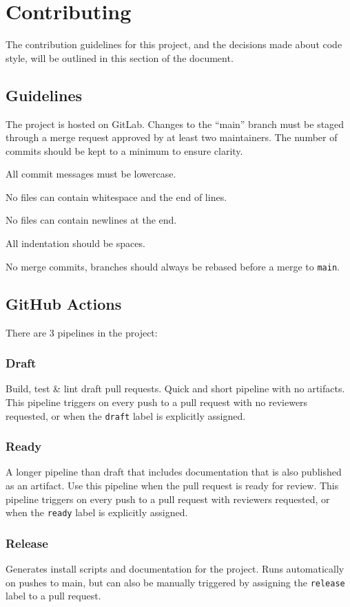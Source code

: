 \pagebreak


\section{Contributing}

The contribution guidelines for this project, and the decisions made about code style,
will be outlined in this section of the document.

\subsection{Guidelines}

The project is hosted on GitLab.
Changes to the ``main'' branch must be staged through a merge request approved by at least two maintainers.
The number of commits should be kept to a minimum to ensure clarity.

All commit messages must be lowercase.

No files can contain whitespace and the end of lines.

No files can contain newlines at the end.

All indentation should be spaces.

No merge commits, branches should always be rebased before a merge to \texttt{main}.

\subsection{GitHub Actions}

There are 3 pipelines in the project:
\subsubsection{Draft}
Build, test \& lint draft pull requests.
Quick and short pipeline with no artifacts.
This pipeline triggers on every push to a pull request with no reviewers requested, or when the \texttt{draft} label is explicitly assigned.
\subsubsection{Ready}
A longer pipeline than draft that includes documentation that is also published as an artifact.
Use this pipeline when the pull request is ready for review.
This pipeline triggers on every push to a pull request with reviewers requested, or when the \texttt{ready} label is explicitly assigned.
\subsubsection{Release}
Generates install scripts and documentation for the project.
Runs automatically on pushes to main, but can also be manually triggered by assigning the \texttt{release} label to a pull request.

